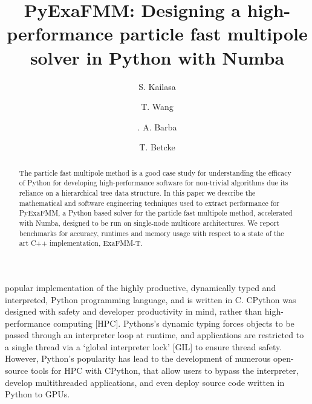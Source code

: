 \documentclass{IEEEcsmag}
\begin{document}

\title{PyExaFMM: Designing a high-performance particle fast multipole solver in Python with Numba}

\author{S. Kailasa}

\author{T. Wang}

\author{. A. Barba}

\author{T. Betcke}


\begin{abstract}
The particle fast multipole method is a good case study for understanding the efficacy of Python for developing high-performance software for non-trivial algorithms due its reliance on a hierarchical tree data structure. In this paper we describe the mathematical and software engineering techniques used to extract performance for PyExaFMM, a Python based solver for the particle fast multipole method, accelerated with Numba, designed to be run on single-node multicore architectures. We report benchmarks for accuracy, runtimes and memory usage with respect to a state of the art C++ implementation, ExaFMM-T.
\end{abstract}

\maketitle
{} popular implementation of the highly productive, dynamically typed and interpreted, Python programming language, and is written in C. CPython was designed with safety and developer productivity in mind, rather than high-performance computing [HPC]. Pythons's dynamic typing forces objects to be passed through an interpreter loop at runtime, and applications are restricted to a single thread via a `global interpreter lock' [GIL] to ensure thread safety. However, Python's popularity has lead to the development of numerous open-source tools for HPC with CPython, that allow users to bypass the interpreter, develop multithreaded applications, and even deploy source code written in Python to GPUs.
\end{document}
